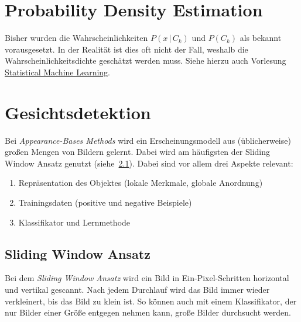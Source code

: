 \documentclass[a4paper, 11pt, accentcolor = tud3b]{tudreport}
\newcommand{\given}{\,\vert\,}
\begin{document}
		\section{Probability Density Estimation}
			Bisher wurden die Wahrscheinlichkeiten \( P(x \given C_k) \) und \( P(C_k) \) als bekannt vorausgesetzt. In der Realität ist dies oft nicht der Fall, weshalb die Wahrscheinlichkeitsdichte geschätzt werden muss. Siehe hierzu auch Vorlesung \href{https://projects.frisp.org/documents/26}{Statistical Machine Learning}.

		\section{Gesichtsdetektion}
			Bei \emph{Appearance-Bases Methods} wird ein Erscheinungsmodell aus (üblicherweise) großen Mengen von Bildern gelernt. Dabei wird am häufigsten der Sliding Window Ansatz genutzt (siehe~\ref{sec:sliding_window}). Dabei sind vor allem drei Aspekte relevant:
			\begin{enumerate}
				\item Repräsentation des Objektes (lokale Merkmale, globale Anordnung)
				\item Trainingsdaten (positive und negative Beispiele)
				\item Klassifikator und Lernmethode
			\end{enumerate}

			\subsection{Sliding Window Ansatz}
				\label{sec:sliding_window}
				
				Bei dem \emph{Sliding Window Ansatz} wird ein Bild in Ein-Pixel-Schritten horizontal und vertikal gescannt. Nach jedem Durchlauf wird das Bild immer wieder verkleinert, bis das Bild zu klein ist. So können auch mit einem Klassifikator, der nur Bilder einer Größe entgegen nehmen kann, große Bilder durchsucht werden.
\end{document}
